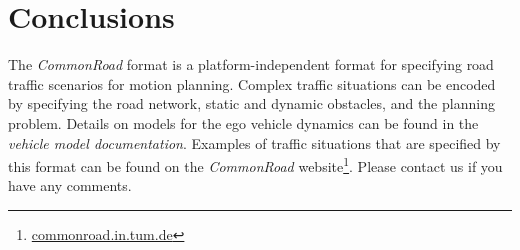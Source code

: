 

\section{Conclusions}

The \textit{CommonRoad} format is a platform-independent format for specifying road traffic scenarios for motion planning.
Complex traffic situations can be encoded by specifying the road network, static and dynamic obstacles, and the planning problem.
Details on models for the ego vehicle dynamics can be found in the \textit{vehicle model documentation}. Examples of traffic situations that are specified by this format can be found on the \textit{CommonRoad} website\footnote{\href{https://commonroad.in.tum.de}{commonroad.in.tum.de}}.
Please contact us if you have any comments.
